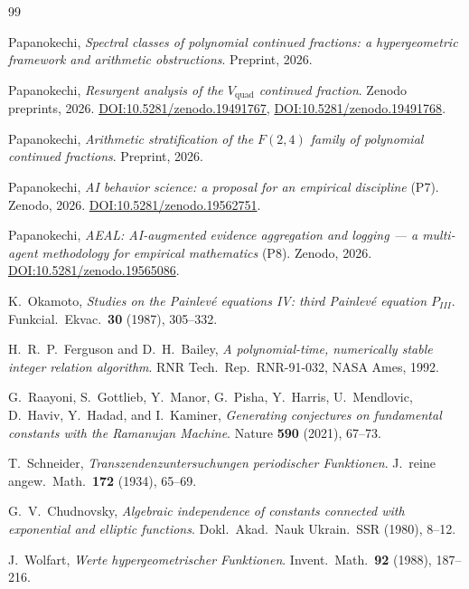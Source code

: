 \documentclass[11pt,reqno]{amsart}
\theoremstyle{definition}
\begin{document}
\begin{thebibliography}{99}

Papanokechi, \emph{Spectral classes of polynomial continued
fractions: a hypergeometric framework and arithmetic
obstructions}.
Preprint, 2026.

Papanokechi, \emph{Resurgent analysis of the
$V_{\mathrm{quad}}$ continued fraction}.
Zenodo preprints, 2026.
\href{https://doi.org/10.5281/zenodo.19491767}
{DOI:10.5281/zenodo.19491767},
\href{https://doi.org/10.5281/zenodo.19491768}
{DOI:10.5281/zenodo.19491768}.

Papanokechi, \emph{Arithmetic stratification of the
$F(2,4)$ family of polynomial continued fractions}.
Preprint, 2026.

Papanokechi, \emph{AI behavior science: a proposal for an
empirical discipline} (P7). Zenodo, 2026.
\href{https://doi.org/10.5281/zenodo.19562751}
{DOI:10.5281/zenodo.19562751}.

Papanokechi, \emph{AEAL: AI-augmented evidence aggregation
and logging --- a multi-agent methodology for empirical
mathematics} (P8). Zenodo, 2026.
\href{https://doi.org/10.5281/zenodo.19565086}
{DOI:10.5281/zenodo.19565086}.

K.~Okamoto, \emph{Studies on the Painlev\'e equations IV: third
Painlev\'e equation $P_{III}$}. Funkcial.\ Ekvac.\ \textbf{30}
(1987), 305--332.

H.~R.~P.~Ferguson and D.~H.~Bailey, \emph{A polynomial-time,
numerically stable integer relation algorithm}. RNR Tech.\ Rep.\
RNR-91-032, NASA Ames, 1992.

G.~Raayoni, S.~Gottlieb, Y.~Manor, G.~Pisha, Y.~Harris,
U.~Mendlovic, D.~Haviv, Y.~Hadad, and I.~Kaminer,
\emph{Generating conjectures on fundamental constants with
the Ramanujan Machine}. Nature \textbf{590} (2021), 67--73.

T.~Schneider, \emph{Transzendenzuntersuchungen periodischer
Funktionen}. J.\ reine angew.\ Math.\ \textbf{172} (1934),
65--69.

G.~V.~Chudnovsky, \emph{Algebraic independence of constants
connected with exponential and elliptic functions}.
Dokl.\ Akad.\ Nauk Ukrain.\ SSR (1980), 8--12.

J.~Wolfart, \emph{Werte hypergeometrischer Funktionen}.
Invent.\ Math.\ \textbf{92} (1988), 187--216.


\end{thebibliography}
\end{document}
